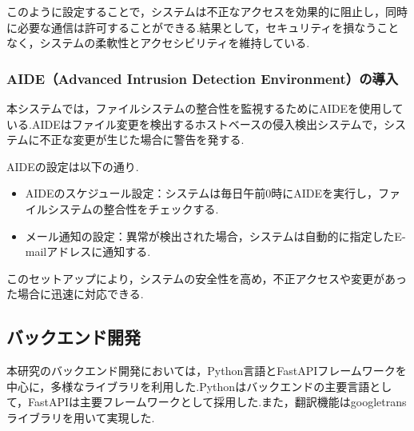 \documentclass[b5paper,12pt,dvipdfmx]{jsreport}
\begin{document}
このように設定することで，システムは不正なアクセスを効果的に阻止し，同時に必要な通信は許可することができる.結果として，セキュリティを損なうことなく，システムの柔軟性とアクセシビリティを維持している.


\subsubsection{AIDE（Advanced Intrusion Detection Environment）の導入}
本システムでは，ファイルシステムの整合性を監視するためにAIDEを使用している.AIDEはファイル変更を検出するホストベースの侵入検出システムで，システムに不正な変更が生じた場合に警告を発する.

AIDEの設定は以下の通り.
\begin{itemize}
    \item AIDEのスケジュール設定：システムは毎日午前0時にAIDEを実行し，ファイルシステムの整合性をチェックする.
    \item メール通知の設定：異常が検出された場合，システムは自動的に指定したE-mailアドレスに通知する.
\end{itemize}
このセットアップにより，システムの安全性を高め，不正アクセスや変更があった場合に迅速に対応できる.


\subsection{バックエンド開発}
本研究のバックエンド開発においては，Python言語とFastAPIフレームワークを中心に，多様なライブラリを利用した.Pythonはバックエンドの主要言語として，FastAPIは主要フレームワークとして採用した.また，翻訳機能はgoogletransライブラリを用いて実現した.
\end{document}
